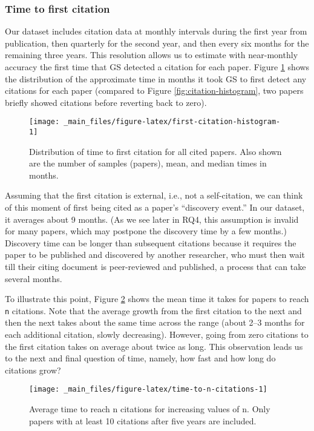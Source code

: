\documentclass{article}
\begin{document}
\hypertarget{time-to-first-citation}{%
\subsubsection{Time to first citation}\label{time-to-first-citation}}

Our dataset includes citation data at monthly intervals during the first year from publication, then quarterly for the second year, and then every six months for the remaining three years.
This resolution allows us to estimate with near-monthly accuracy the first time that GS detected a citation for each paper.
Figure \ref{fig:first-citation-histogram} shows the distribution of the approximate time in months it took GS to first detect any citations for each paper (compared to Figure \ref{fig:citation-histogram}, two papers briefly showed citations before reverting back to zero).

\begin{figure}
\texttt{[image: \_main\_files/figure-latex/first-citation-histogram-1]} \caption{Distribution of time to first citation for all cited papers. Also shown are the number of samples (papers), mean, and median times in months.}\label{fig:first-citation-histogram}
\end{figure}

Assuming that the first citation is external, i.e., not a self-citation, we can think of this moment of first being cited as a paper's ``discovery event.''
In our dataset, it averages about 9 months.
(As we see later in RQ4, this assumption is invalid for many papers, which may postpone the discovery time by a few months.)
Discovery time can be longer than subsequent citations because it requires the paper to be published and discovered by another researcher, who must then wait till their citing document is peer-reviewed and published, a process that can take several months.

To illustrate this point, Figure \ref{fig:time-to-n-citations} shows the mean time it takes for papers to reach \texttt{n} citations.
Note that the average growth from the first citation to the next and then the next takes about the same time across the range (about 2--3 months for each additional citation, slowly decreasing).
However, going from zero citations to the first citation takes on average about twice as long.
This observation leads us to the next and final question of time, namely, how fast and how long do citations grow?

\begin{figure}
\texttt{[image: \_main\_files/figure-latex/time-to-n-citations-1]} \caption{Average time to reach n citations for increasing values of n. Only papers with at least 10 citations after five years are included.}\label{fig:time-to-n-citations}
\end{figure}
\end{document}
